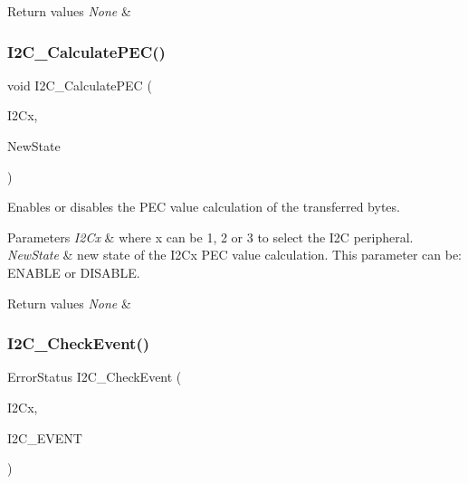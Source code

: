 \begin{DoxyRetVals}{Return values}
{\em None} & \\
\hline
\end{DoxyRetVals}
\mbox{\label{group___i2_c_gae86801251359226c35745e0a258388b0}} 
\subsubsection{\texorpdfstring{I2\+C\+\_\+\+Calculate\+P\+E\+C()}{I2C\_CalculatePEC()}}
{\footnotesize\ttfamily void I2\+C\+\_\+\+Calculate\+P\+EC (\begin{DoxyParamCaption}\item[{I2\+C\+\_\+\+Type\+Def $\ast$}]{I2\+Cx,  }\item[{Functional\+State}]{New\+State }\end{DoxyParamCaption})}



Enables or disables the P\+EC value calculation of the transferred bytes. 


\begin{DoxyParams}{Parameters}
{\em I2\+Cx} & where x can be 1, 2 or 3 to select the I2C peripheral. \\
\hline
{\em New\+State} & new state of the I2\+Cx P\+EC value calculation. This parameter can be\+: E\+N\+A\+B\+LE or D\+I\+S\+A\+B\+LE. \\
\hline
\end{DoxyParams}

\begin{DoxyRetVals}{Return values}
{\em None} & \\
\hline
\end{DoxyRetVals}
\mbox{\label{group___i2_c_ga2d5701342f9d4c1f09bf9d3cdcacc326}} 
\subsubsection{\texorpdfstring{I2\+C\+\_\+\+Check\+Event()}{I2C\_CheckEvent()}}
{\footnotesize\ttfamily Error\+Status I2\+C\+\_\+\+Check\+Event (\begin{DoxyParamCaption}\item[{I2\+C\+\_\+\+Type\+Def $\ast$}]{I2\+Cx,  }\item[{uint32\+\_\+t}]{I2\+C\+\_\+\+E\+V\+E\+NT }\end{DoxyParamCaption})}



